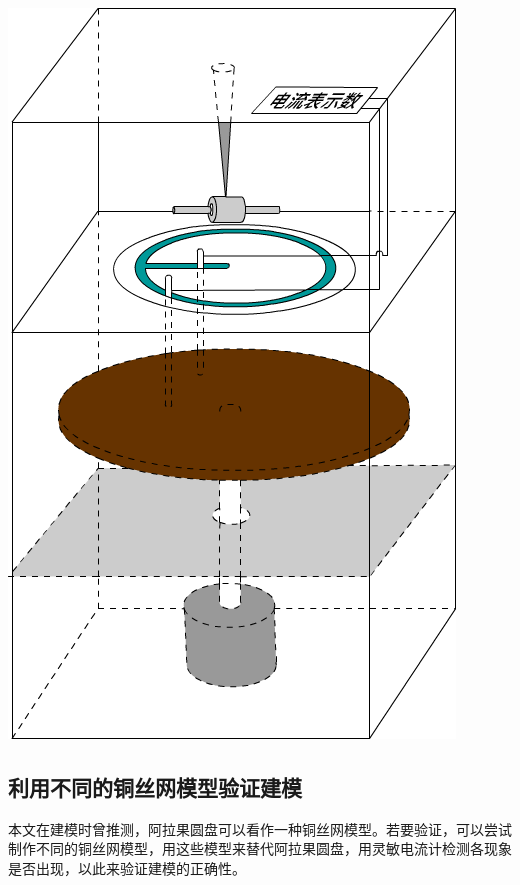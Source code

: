 \documentclass{CLGPY}
\begin{document}
\begin{multicols}{1}
        \begin{center}
            \includegraphics[scale=.3]{./fig/111.png}
        \end{center}

\subsection{利用不同的铜丝网模型验证建模}
本文在建模时曾推测，阿拉果圆盘可以看作一种铜丝网模型。若要验证，可以尝试制作不同的铜丝网模型，用这些模型来替代阿拉果圆盘，用灵敏电流计检测各现象是否出现，以此来验证建模的正确性。


\end{multicols}
\end{document}
